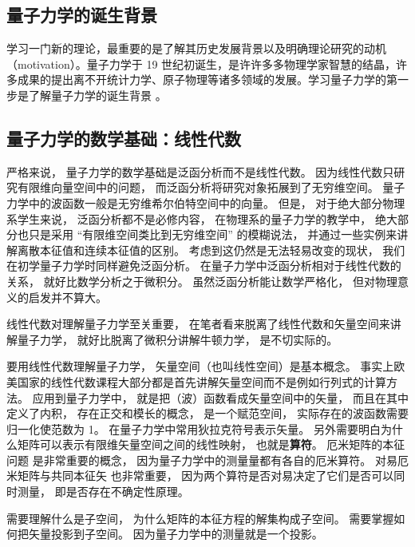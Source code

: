 
\begin{issues}
\issueTODO
\end{issues}
\subsection{量子力学的诞生背景}
学习一门新的理论，最重要的是了解其历史发展背景以及明确理论研究的动机（motivation）。量子力学于 19 世纪初诞生，是许许多多物理学家智慧的结晶，许多成果的提出离不开统计力学、原子物理等诸多领域的发展。学习量子力学的第一步是了解量子力学的诞生背景 。

\subsection{量子力学的数学基础：线性代数}
严格来说， 量子力学的数学基础是泛函分析而不是线性代数。 因为线性代数只研究有限维向量空间中的问题， 而泛函分析将研究对象拓展到了无穷维空间。 量子力学中的波函数一般是无穷维希尔伯特空间中的向量。 但是， 对于绝大部分物理系学生来说， 泛函分析都不是必修内容， 在物理系的量子力学的教学中， 绝大部分也只是采用 “有限维空间类比到无穷维空间” 的模糊说法， 并通过一些实例来讲解离散本征值和连续本征值的区别。 考虑到这仍然是无法轻易改变的现状， 我们在初学量子力学时同样避免泛函分析。 在量子力学中泛函分析相对于线性代数的关系， 就好比数学分析之于微积分。 虽然泛函分析能让数学严格化， 但对物理意义的启发并不算大。

线性代数对理解量子力学至关重要， 在笔者看来脱离了线性代数和矢量空间来讲解量子力学， 就好比脱离了微积分讲解牛顿力学， 是不切实际的。 

要用线性代数理解量子力学， 矢量空间（也叫线性空间）是基本概念。 事实上欧美国家的线性代数课程大部分都是首先讲解矢量空间而不是例如行列式的计算方法。 应用到量子力学中， 就是把（波）函数看成矢量空间中的矢量， 而且在其中定义了内积， 存在正交和模长的概念， 是一个赋范空间， 实际存在的波函数需要归一化使范数为 1。 在量子力学中常用狄拉克符号表示矢量。 另外需要明白为什么矩阵可以表示有限维矢量空间之间的线性映射， 也就是\textbf{算符}。 厄米矩阵的本征问题 是非常重要的概念， 因为量子力学中的测量量都有各自的厄米算符。 对易厄米矩阵与共同本征矢 也非常重要， 因为两个算符是否对易决定了它们是否可以同时测量， 即是否存在不确定性原理。

需要理解什么是子空间， 为什么矩阵的本征方程的解集构成子空间。 需要掌握如何把矢量投影到子空间。 因为量子力学中的测量就是一个投影。

